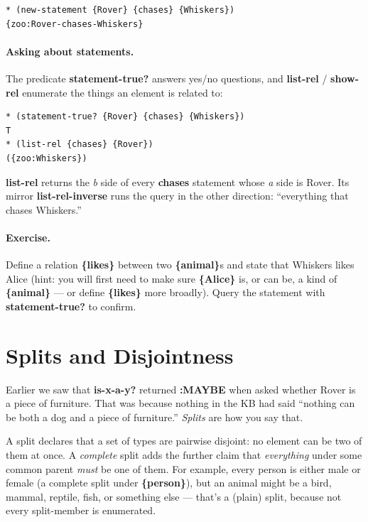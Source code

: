 \documentclass[titlepage,twoside,openright,11pt]{article}
\begin{document}
\begin{verbatim}
* (new-statement {Rover} {chases} {Whiskers})
{zoo:Rover-chases-Whiskers}
\end{verbatim}

\paragraph{Asking about statements.}
The predicate \textbf{statement-true?} answers yes/no questions,
and \textbf{list-rel} / \textbf{show-rel} enumerate the things an
element is related to:

\begin{verbatim}
* (statement-true? {Rover} {chases} {Whiskers})
T
* (list-rel {chases} {Rover})
({zoo:Whiskers})
\end{verbatim}

\textbf{list-rel} returns the \emph{b} side of every \textbf{chases}
statement whose \emph{a} side is Rover. Its mirror
\textbf{list-rel-inverse} runs the query in the other direction:
``everything that chases Whiskers.''

\paragraph{Exercise.}
Define a relation \textbf{\{likes\}} between two \textbf{\{animal\}}s
and state that Whiskers likes Alice (hint: you will first need to
make sure \textbf{\{Alice\}} is, or can be, a kind of
\textbf{\{animal\}} --- or define \textbf{\{likes\}} more broadly).
Query the statement with \textbf{statement-true?} to confirm.

\section{Splits and Disjointness}\label{splits-and-disjointness}

Earlier we saw that \textbf{is-x-a-y?} returned \textbf{:MAYBE}
when asked whether Rover is a piece of furniture. That was because
nothing in the KB had said ``nothing can be both a dog and a piece
of furniture.'' \emph{Splits} are how you say that.

A split declares that a set of types are pairwise disjoint: no
element can be two of them at once. A \emph{complete} split adds
the further claim that \emph{everything} under some common parent
\emph{must} be one of them. For example, every person is either
male or female (a complete split under \textbf{\{person\}}), but
an animal might be a bird, mammal, reptile, fish, or something else
--- that's a (plain) split, because not every split-member is
enumerated.
\end{document}
